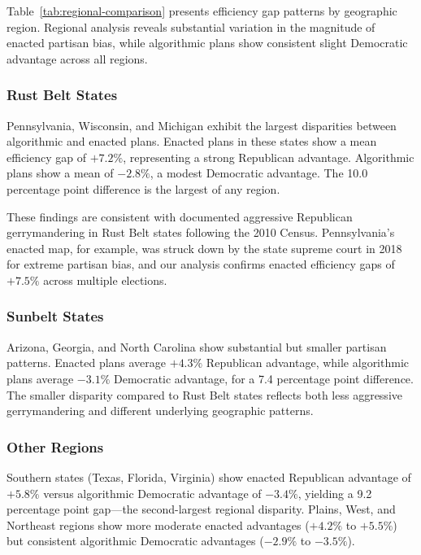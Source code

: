 Table~\ref{tab:regional-comparison} presents efficiency gap patterns by geographic region. Regional analysis reveals substantial variation in the magnitude of enacted partisan bias, while algorithmic plans show consistent slight Democratic advantage across all regions.



\subsubsection{Rust Belt States}

Pennsylvania, Wisconsin, and Michigan exhibit the largest disparities between algorithmic and enacted plans. Enacted plans in these states show a mean efficiency gap of $+7.2\%$, representing a strong Republican advantage. Algorithmic plans show a mean of $-2.8\%$, a modest Democratic advantage. The 10.0 percentage point difference is the largest of any region.

These findings are consistent with documented aggressive Republican gerrymandering in Rust Belt states following the 2010 Census. Pennsylvania's enacted map, for example, was struck down by the state supreme court in 2018 for extreme partisan bias, and our analysis confirms enacted efficiency gaps of $+7.5\%$ across multiple elections.

\subsubsection{Sunbelt States}

Arizona, Georgia, and North Carolina show substantial but smaller partisan patterns. Enacted plans average $+4.3\%$ Republican advantage, while algorithmic plans average $-3.1\%$ Democratic advantage, for a 7.4 percentage point difference. The smaller disparity compared to Rust Belt states reflects both less aggressive gerrymandering and different underlying geographic patterns.

\subsubsection{Other Regions}

Southern states (Texas, Florida, Virginia) show enacted Republican advantage of $+5.8\%$ versus algorithmic Democratic advantage of $-3.4\%$, yielding a 9.2 percentage point gap---the second-largest regional disparity. Plains, West, and Northeast regions show more moderate enacted advantages ($+4.2\%$ to $+5.5\%$) but consistent algorithmic Democratic advantages ($-2.9\%$ to $-3.5\%$).

